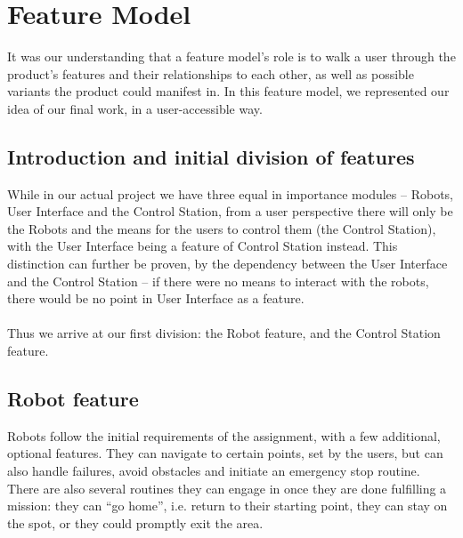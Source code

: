 \section{Feature Model}
It was our understanding that a feature model’s role is to walk a user through the product’s features and their relationships to each other, as well as possible variants the product could manifest in. In this feature model, we represented our idea of our final work, in a user-accessible way.
\subsection{Introduction and initial division of features}
While in our actual project we have three equal in importance modules – Robots, User Interface and the Control Station, from a user perspective there will only be the Robots and the means for the users to control them (the Control Station), with the User Interface being a feature of Control Station instead. This distinction can further be proven, by the dependency between the User Interface and the Control Station – if there were no means to interact with the robots, there would be no point in User Interface as a feature.
\\ \\
Thus we arrive at our first division: the Robot feature, and the Control Station feature.
\subsection{Robot feature}
Robots follow the initial requirements of the assignment, with a few additional, optional features. They can navigate to certain points, set by the users, but can also handle failures, avoid obstacles and initiate an emergency stop routine. There are also several routines they can engage in once they are done fulfilling a mission: they can “go home”, i.e. return to their starting point, they can stay on the spot, or they could promptly exit the area. 
